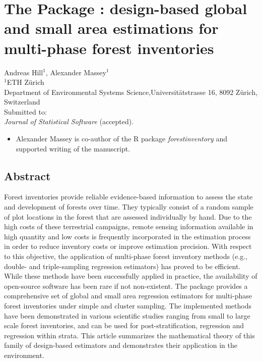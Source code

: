\chapter{The  Package : design-based global and small area estimations for multi-phase forest inventories}
\label{chap:rpack}
{\large Andreas Hill$^1$, Alexander Massey$^1$}\\

\vspace{3cm}
\noindent
$^1$ETH Z\"urich\\Department of Environmental Systems Science,Universit\"atstrasse 16, 8092 Z\"urich, Switzerland \\

\vspace{\fill}
\noindent
Submitted to:\\
\textit{Journal of Statistical Software} (accepted).

\newpage
\thispagestyle{plain}
\renewcommand{\labelitemi}{--}
\begin{itemize}
	\item Alexander Massey is co-author of the R package \textit{forestinventory} and supported writing of the manuscript.
\end{itemize}

\clearpage
\section*{Abstract}
\label{chap:rpack:Abstract}
Forest inventories provide reliable evidence-based information to assess the state and development of forests over time.  They typically consist of a random sample of plot locations in the forest that are assessed individually by hand. Due to the high costs of these terrestrial campaigns, remote sensing information available in high quantity and low costs is frequently incorporated in the estimation process in order to reduce inventory costs or improve estimation precision. With respect to this objective, the application of multi-phase forest inventory methods (e.g., double- and triple-sampling regression estimators) has proved to be efficient. While these methods have been successfully applied in practice, the availability of open-source software has been rare if not non-existent. The  package  provides a comprehensive set of global and small area regression estimators for multi-phase forest inventories under simple and cluster sampling. The implemented methods have been demonstrated in various scientific studies ranging from small to large scale forest inventories, and can be used for post-stratification, regression and regression within strata. This article summarizes the mathematical theory of this family of design-based estimators and demonstrates their application in the  environment.


